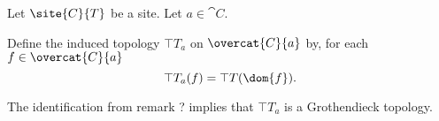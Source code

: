 \begin{definition}
Let $\site{C}{T}$ be a site.
Let $a \in \cat{C}$.

Define the induced topology $\top{T}_a$ on $\overcat{C}{a}$
by, for each $f \in \overcat{C}{a}$
\[\top{T}_a(f) = \top{T}(\dom{f}).\]

The identification from remark ? implies that $\top{T}_a$ is a Grothendieck topology.
\end{definition}












